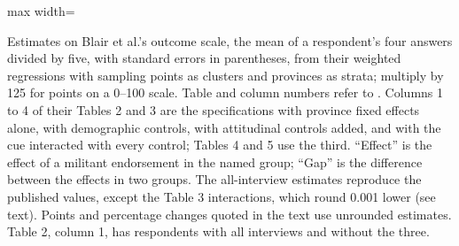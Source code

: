 \documentclass[11pt,letterpaper]{article}
\newcommand{\TableStyle}{\normalsize\setlength{\tabcolsep}{6pt}\renewcommand{\arraystretch}{1}}
\newcommand{\tablenote}[1]{\par\smallskip\begin{minipage}{\linewidth}\footnotesize #1\end{minipage}}
\begin{document}
\begin{table}[htbp]
\centering\TableStyle
\caption{Blair et al.'s estimates with and without interviewers 7, 37, and 71}
\label{tab:blair_findings}
\begin{adjustbox}{max width=\linewidth}

\end{adjustbox}
\tablenote{Estimates on Blair et al.'s outcome scale, the mean of a respondent's four answers divided by five, with standard errors in parentheses, from their weighted regressions with sampling points as clusters and provinces as strata; multiply by 125 for points on a 0--100 scale. Table and column numbers refer to \citet{blair2013poverty}. Columns 1 to 4 of their Tables 2 and 3 are the specifications with province fixed effects alone, with demographic controls, with attitudinal controls added, and with the cue interacted with every control; Tables 4 and 5 use the third. ``Effect'' is the effect of a militant endorsement in the named group; ``Gap'' is the difference between the effects in two groups. The all-interview estimates reproduce the published values, except the Table 3 interactions, which round 0.001 lower (see text). Points and percentage changes quoted in the text use unrounded estimates. Table 2, column 1, has \BlairNFull{} respondents with all interviews and \BlairNWithout{} without the three.}
\end{table}
\end{document}
